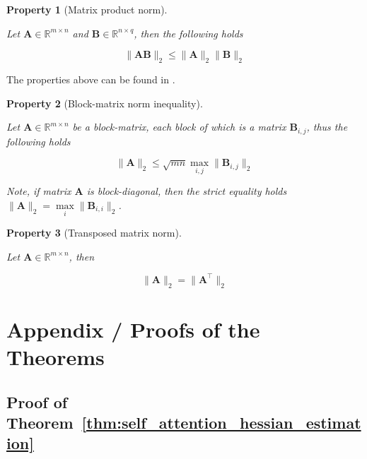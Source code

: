\documentclass{article}
\newtheorem{property}{Property}
\begin{document}
\begin{property} [Matrix product norm] \label{prop:matrix_product_norm}

Let $\mathbf{A} \in \mathbb{R}^{m \times n}$ and $\mathbf{B} \in \mathbb{R}^{n \times q}$, then the following holds

\begin{equation*}
    \| \mathbf{A} \mathbf{B}\|_2 \leq \| \mathbf{A}\|_2 \| \mathbf{B}\|_2
\end{equation*}
    
\end{property}

The properties above can be found in \cite{magnus1988matrix}.

\begin{property} [Block-matrix norm inequality] \label{prop:block_matrix_norm}

Let $\mathbf{A} \in \mathbb{R}^{m \times n}$ be a block-matrix, each block of which is a matrix $\mathbf{B}_{i,j}$, thus the following holds

\begin{equation*}
    \| \mathbf{A} \|_2 \leq \sqrt{m n} \max\limits_{i,j}\| \mathbf{B}_{i,j}\|_2
\end{equation*}

Note, if matrix $\mathbf{A}$ is block-diagonal, then the strict equality holds $\| \mathbf{A} \|_2 = \max\limits_{i}\| \mathbf{B}_{i,i}\|_2$.
\end{property}

\begin{property} [Transposed matrix norm] \label{prop:transposed_matrix_norm}

Let $\mathbf{A} \in \mathbb{R}^{m \times n}$, then

\begin{equation*}
    \| \mathbf{A}\|_2 = \| \mathbf{A}^\top\|_2
\end{equation*}
    
\end{property}

\section{Appendix / Proofs of the Theorems}\label{app:B}
\subsection{Proof of Theorem~\ref{thm:self_attention_hessian_estimation}}\label{app:proof_self_attention_hessian_estimation}
\end{document}
